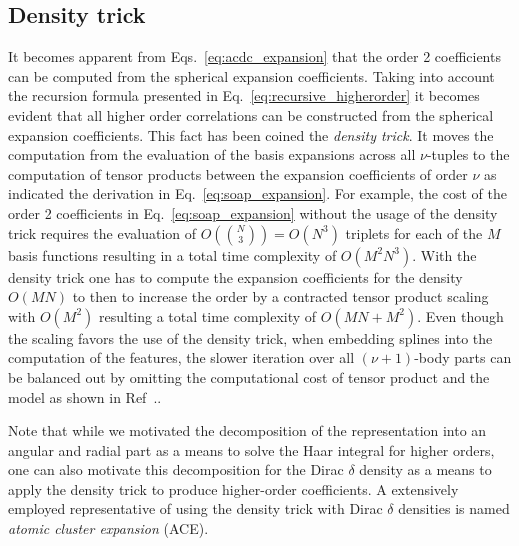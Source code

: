 \subsection{Density trick}
It becomes apparent from Eqs.~\ref{eq:acdc_expansion} that the order 2 coefficients can be computed from the spherical expansion coefficients.
Taking into account the recursion formula presented in Eq.~\ref{eq:recursive_higherorder} it becomes evident that all higher order correlations can be constructed from the spherical expansion coefficients.
This fact %
has been coined the \emph{density trick}.
It moves the computation from the evaluation of the basis expansions across all $\nu$-tuples to the computation of tensor products between the expansion coefficients of order $\nu$ as indicated the derivation in Eq.~\ref{eq:soap_expansion}.
For example, the cost of the order 2 coefficients in Eq.~\ref{eq:soap_expansion} without the usage of the density trick requires the evaluation of $O({N\choose 3}) = O(N^3)$ triplets for each of the $M$ basis functions resulting in a total time complexity of $O(M^2N^3)$.
With the density trick one has to compute the expansion coefficients for the density $O(MN)$ to then to increase the order by a contracted tensor product scaling with $O(M^2)$ resulting a total time complexity of $O(MN+M^2)$.
Even though the scaling favors the use of the density trick, when embedding splines into the computation of the features, the slower iteration over all $(\nu+1)$-body parts can be balanced out by omitting the computational cost of tensor product and the model as shown in Ref~.\cite{xie2023ultra}.

Note that while we motivated the decomposition of the representation into an angular and radial part as a means to solve the Haar integral for higher orders, one can also motivate this decomposition for the Dirac $\delta$ density as a means to apply the density trick to produce higher-order coefficients.
A extensively employed representative of using the density trick with Dirac $\delta$ densities is named \emph{atomic cluster expansion} (ACE)\cite{drautz2019atomic}.

